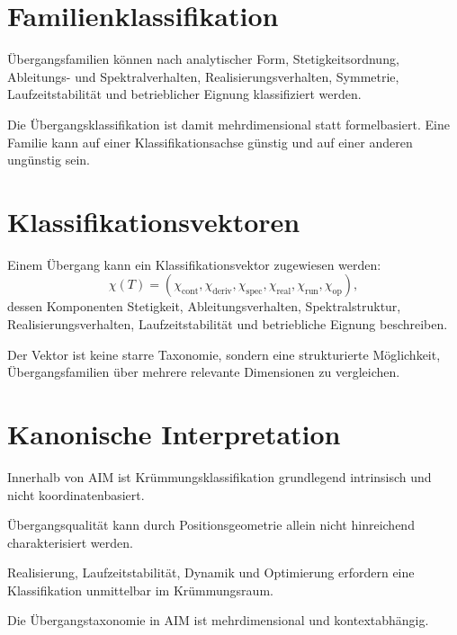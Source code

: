 \section{Familienklassifikation}

\begin{definition}
\label{def:transition-family-classification}
Übergangsfamilien können nach analytischer Form, Stetigkeitsordnung,
Ableitungs- und Spektralverhalten, Realisierungsverhalten, Symmetrie,
Laufzeitstabilität und betrieblicher Eignung klassifiziert werden.
\end{definition}

Die Übergangsklassifikation ist damit mehrdimensional statt formelbasiert. Eine
Familie kann auf einer Klassifikationsachse günstig und auf einer anderen
ungünstig sein.

\section{Klassifikationsvektoren}

\begin{definition}[Klassifikationsvektor]
\label{def:classification-vector}
Einem Übergang kann ein Klassifikationsvektor zugewiesen werden:
\[
\chi(T)=(
\chi_{\mathrm{cont}},
\chi_{\mathrm{deriv}},
\chi_{\mathrm{spec}},
\chi_{\mathrm{real}},
\chi_{\mathrm{run}},
\chi_{\mathrm{op}}
),
\]
dessen Komponenten Stetigkeit, Ableitungsverhalten, Spektralstruktur,
Realisierungsverhalten, Laufzeitstabilität und betriebliche Eignung
beschreiben.
\end{definition}

Der Vektor ist keine starre Taxonomie, sondern eine strukturierte Möglichkeit,
Übergangsfamilien über mehrere relevante Dimensionen zu vergleichen.

\section{Kanonische Interpretation}

\begin{proposition}
Innerhalb von AIM ist Krümmungsklassifikation grundlegend intrinsisch und
nicht koordinatenbasiert.
\end{proposition}
\begin{proposition}
Übergangsqualität kann durch Positionsgeometrie allein nicht hinreichend
charakterisiert werden.
\end{proposition}
\begin{proposition}
Realisierung, Laufzeitstabilität, Dynamik und Optimierung erfordern eine
Klassifikation unmittelbar im Krümmungsraum.
\end{proposition}
\begin{proposition}
Die Übergangstaxonomie in AIM ist mehrdimensional und kontextabhängig.
\end{proposition}

